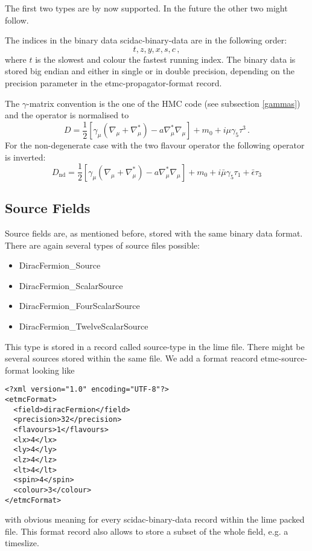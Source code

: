 The first two types are by now supported. In the future the other two
might follow.

The indices in the binary data {\ttfamily scidac-binary-data} are in
the following order:
\[
t, z, y, x, s, c\, ,
\]
where $t$ is the slowest and colour the fastest running index.
The binary data is stored big endian and either in single or in double
precision, depending on the {\ttfamily precision} parameter in the
{\ttfamily etmc-propagator-format} record. 

The $\gamma$-matrix convention is the one of the HMC code (see
subsection \ref{gammas}) and the operator is normalised to
\[
D =
\frac{1}{2}[\gamma_\mu(\nabla_\mu+\nabla_\mu^*)-a\nabla_\mu^*\nabla_\mu]
+ m_0 + i \mu\gamma_5\tau^3\, .
\]
For the non-degenerate case with the two flavour operator the
following operator is inverted:
\[
D_\mathrm{nd} =
\frac{1}{2}[\gamma_\mu(\nabla_\mu+\nabla_\mu^*)-a\nabla_\mu^*\nabla_\mu]
+ m_0 + i\bar\mu\gamma_5\tau_1+\bar\epsilon\tau_3
\]

\subsection{Source Fields}

Source fields are, as mentioned before, stored with the same binary
data format. There are again several types of source files possible:
\begin{itemize}
\item {\ttfamily DiracFermion\_Source}
\item {\ttfamily DiracFermion\_ScalarSource}
\item {\ttfamily DiracFermion\_FourScalarSource}
\item {\ttfamily DiracFermion\_TwelveScalarSource}
\end{itemize}
This type is stored in a record called {\ttfamily source-type} in the
lime file. There might be several sources stored within the same
file. We add a format reacord {\ttfamily etmc-source-format} looking like
\begin{verbatim}
<?xml version="1.0" encoding="UTF-8"?>
<etmcFormat>
  <field>diracFermion</field>
  <precision>32</precision>
  <flavours>1</flavours>
  <lx>4</lx>
  <ly>4</ly>
  <lz>4</lz>
  <lt>4</lt>
  <spin>4</spin>
  <colour>3</colour>
</etmcFormat>
\end{verbatim}
with obvious meaning for every {\ttfamily scidac-binary-data} record
within the lime packed file. This format record also allows to store a
subset of the whole field, e.g. a timeslize.


